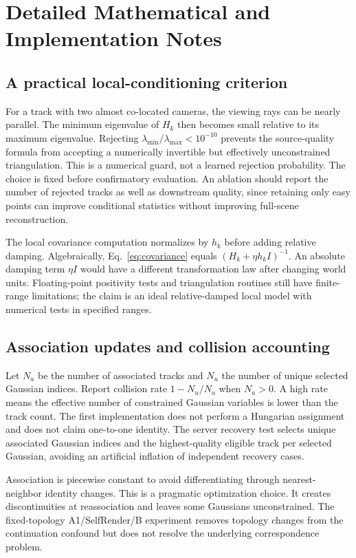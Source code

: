 \documentclass[10pt,twocolumn,letterpaper]{article}
\begin{document}
\clearpage
\appendix
\section{Detailed Mathematical and Implementation Notes}
\subsection{A practical local-conditioning criterion}
For a track with two almost co-located cameras, the viewing rays can be nearly parallel. The minimum eigenvalue of $H_k$ then becomes small relative to its maximum eigenvalue. Rejecting $\lambda_{\min}/\lambda_{\max}<10^{-10}$ prevents the source-quality formula from accepting a numerically invertible but effectively unconstrained triangulation. This is a numerical guard, not a learned rejection probability. The choice is fixed before confirmatory evaluation. An ablation should report the number of rejected tracks as well as downstream quality, since retaining only easy points can improve conditional statistics without improving full-scene reconstruction.

The local covariance computation normalizes by $h_k$ before adding relative damping. Algebraically, Eq.~\eqref{eq:covariance} equals $(H_k+\eta h_kI)^{-1}$. An absolute damping term $\eta I$ would have a different transformation law after changing world units. Floating-point positivity tests and triangulation routines still have finite-range limitations; the claim is an ideal relative-damped local model with numerical tests in specified ranges.

\subsection{Association updates and collision accounting}
Let $N_a$ be the number of associated tracks and $N_u$ the number of unique selected Gaussian indices. Report collision rate $1-N_u/N_a$ when $N_a>0$. A high rate means the effective number of constrained Gaussian variables is lower than the track count. The first implementation does not perform a Hungarian assignment and does not claim one-to-one identity. The server recovery test selects unique associated Gaussian indices and the highest-quality eligible track per selected Gaussian, avoiding an artificial inflation of independent recovery cases.

Association is piecewise constant to avoid differentiating through nearest-neighbor identity changes. This is a pragmatic optimization choice. It creates discontinuities at reassociation and leaves some Gaussians unconstrained. The fixed-topology A1/SelfRender/B experiment removes topology changes from the continuation confound but does not resolve the underlying correspondence problem.
\end{document}

